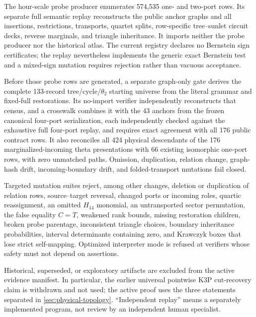 The hour-scale probe producer enumerates 574,535 one- and two-port rows.  Its
separate full semantic replay reconstructs the public anchor graphs and all
insertions, restrictions, transports, quartet splits, row-specific
tree--sunlet circuit decks, reverse marginals, and triangle inheritance.  It
imports neither the probe producer nor the historical atlas.  The current
registry declares no Bernstein sign certificates; the replay nevertheless
implements the generic exact Bernstein test and a mixed-sign mutation requires
rejection rather than vacuous acceptance.

Before those probe rows are generated, a separate graph-only gate derives the
complete 133-record tree/cycle/\(\theta_2\) starting universe from the literal
grammar and fixed-full restorations.  Its no-import verifier independently
reconstructs that census, and a crosswalk combines it with the 43 anchors from
the frozen canonical four-port serialization, each independently checked
against the exhaustive full four-port replay, and requires exact agreement
with all 176 public contract rows.  It also reconciles all 424 physical descendants of the 176
marginalized-incoming theta presentations with 66 existing isomorphic
one-port rows, with zero unmatched paths.  Omission, duplication, relation
change, graph-hash drift, incoming-boundary drift, and folded-transport
mutations fail closed.

Targeted mutation suites reject, among other changes, deletion or duplication
of relation rows, source--target reversal, changed ports or incoming roles,
quartic reassignment, an omitted \(H_{14}\) monomial, an untransported sector
permutation, the false equality \(C=T\), weakened rank bounds, missing
restoration children, broken probe parentage, inconsistent triangle choices,
boundary inheritance probabilities, interval determinants containing zero,
and Krawczyk boxes that lose strict self-mapping.  Optimized interpreter mode
is refused at verifiers whose safety must not depend on assertions.

Historical, superseded, or exploratory artifacts are excluded from the
active evidence manifest.  In particular, the earlier universal pointwise
K3P cut-recovery claim is withdrawn and not used; the active proof uses the
three statements separated in \cref{sec:physical-topology}.  ``Independent
replay'' means a separately implemented program, not review by an independent
human specialist.
